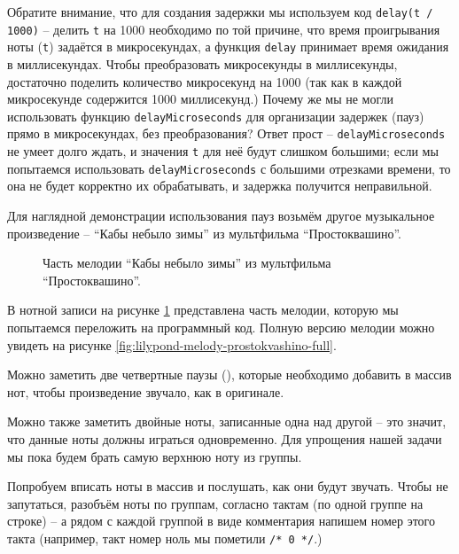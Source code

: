 \documentclass[a4paper,twoside]{book}
\begin{document}
Обратите внимание, что для создания задержки мы используем код \texttt{delay(t /
  1000)} -- делить \texttt{t} на 1000 необходимо по той причине, что время
проигрывания ноты (\texttt{t}) задаётся в микросекундах, а функция
\texttt{delay} принимает время ожидания в миллисекундах. Чтобы преобразовать
микросекунды в миллисекунды, достаточно поделить количество микросекунд на 1000
(так как в каждой микросекунде содержится 1000 миллисекунд.) Почему же мы не
могли использовать функцию \texttt{delayMicroseconds} для организации задержек
(пауз) прямо в микросекундах, без преобразования? Ответ прост --
\texttt{delayMicroseconds} не умеет долго ждать, и значения \texttt{t} для неё
будут слишком большими; если мы попытаемся использовать
\texttt{delayMicroseconds} с большими отрезками времени, то она не будет
корректно их обрабатывать, и задержка получится неправильной.

Для наглядной демонстрации использования пауз возьмём другое музыкальное
произведение -- ``Кабы небыло зимы'' из мультфильма ``Простоквашино''.

\begin{figure}[ht]
  \caption{Часть мелодии ``Кабы небыло зимы'' из мультфильма ``Простоквашино''.}
  \label{fig:lilypond-melody-prostokvashino}
\end{figure}

В нотной записи на рисунке \ref{fig:lilypond-melody-prostokvashino} представлена
часть мелодии, которую мы попытаемся переложить на программный код. Полную
версию мелодии можно увидеть на рисунке
\ref{fig:lilypond-melody-prostokvashino-full}.

Можно заметить две четвертные паузы (\crotchetRest), которые необходимо добавить
в массив нот, чтобы произведение звучало, как в оригинале.

Можно также заметить двойные ноты, записанные одна над другой -- это значит, что
данные ноты должны играться одновременно. Для упрощения нашей задачи мы пока
будем брать самую верхнюю ноту из группы.

Попробуем вписать ноты в массив и послушать, как они будут звучать. Чтобы не
запутаться, разобъём ноты по группам, согласно тактам (по одной группе на
строке) -- а рядом с каждой группой в виде комментария напишем номер этого такта
(например, такт номер ноль мы пометили \texttt{/* 0 */}.)
\end{document}
